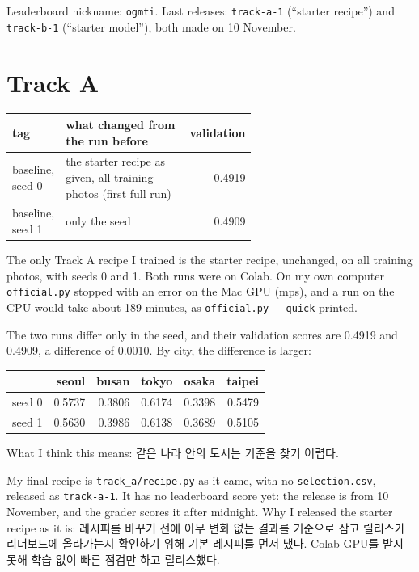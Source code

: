 \documentclass[11pt]{article}
\begin{document}
\makeheader

Leaderboard nickname: \texttt{ogmti}. Last releases: \texttt{track-a-1}
(``starter recipe'') and \texttt{track-b-1} (``starter model''), both made on
10 November.

\section*{Track A}

\begin{center}\footnotesize
\begin{tabular}{lp{0.6\linewidth}r}
\toprule
tag & what changed from the run before & validation \\
\midrule
baseline, seed 0 & the starter recipe as given, all training photos (first full run) & 0.4919 \\
baseline, seed 1 & only the seed & 0.4909 \\
\bottomrule
\end{tabular}
\end{center}

The only Track A recipe I trained is the starter recipe, unchanged, on all
training photos, with seeds 0 and 1. Both runs were on Colab. On my own
computer \texttt{official.py} stopped with an error on the Mac GPU (mps), and
a run on the CPU would take about 189 minutes, as \texttt{official.py -{}-quick}
printed.

The two runs differ only in the seed, and their validation scores are 0.4919
and 0.4909, a difference of 0.0010. By city, the difference is larger:

\begin{center}\footnotesize
\begin{tabular}{lrrrrr}
\toprule
 & seoul & busan & tokyo & osaka & taipei \\
\midrule
seed 0 & 0.5737 & 0.3806 & 0.6174 & 0.3398 & 0.5479 \\
seed 1 & 0.5630 & 0.3986 & 0.6138 & 0.3689 & 0.5105 \\
\bottomrule
\end{tabular}
\end{center}

What I think this means: 같은 나라 안의 도시는 기준을 찾기 어렵다.

My final recipe is \texttt{track\_a/recipe.py} as it came, with no
\texttt{selection.csv}, released as \texttt{track-a-1}. It has no leaderboard
score yet: the release is from 10 November, and the grader scores it after
midnight. Why I released the starter recipe as it is: 레시피를 바꾸기 전에 아무 변화 없는 결과를 기준으로 삼고 릴리스가 리더보드에 올라가는지 확인하기 위해 기본 레시피를 먼저 냈다. Colab GPU를 받지 못해 학습 없이 빠른 점검만 하고 릴리스했다.
\end{document}
